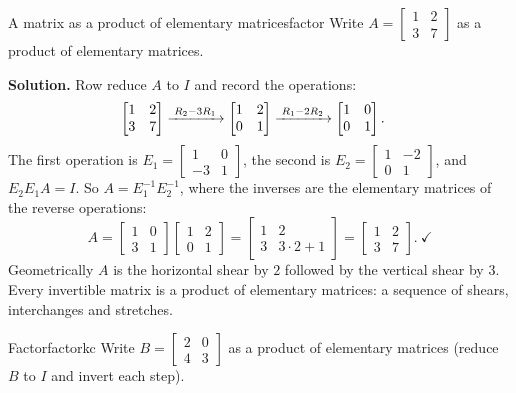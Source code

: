 \documentclass[11pt]{article}
\begin{document}
\begin{exmp}{A matrix as a product of elementary matrices}{factor}
Write $A=\begin{bmatrix}1&2\\3&7\end{bmatrix}$ as a product of elementary matrices.

\textbf{Solution.} Row reduce $A$ to $I$ and record the operations:
\begin{align*}
\begin{bmatrix}1&2\\3&7\end{bmatrix}
&\xrightarrow{\;R_2-3R_1\;}
\begin{bmatrix}1&2\\0&1\end{bmatrix}
\xrightarrow{\;R_1-2R_2\;}
\begin{bmatrix}1&0\\0&1\end{bmatrix}.
\end{align*}
The first operation is $E_1=\begin{bmatrix}1&0\\-3&1\end{bmatrix}$, the second is $E_2=\begin{bmatrix}1&-2\\0&1\end{bmatrix}$, and $E_2E_1A=I$. So $A=E_1^{-1}E_2^{-1}$, where the inverses are the elementary matrices of the reverse operations:
\[
A=\begin{bmatrix}1&0\\3&1\end{bmatrix}\begin{bmatrix}1&2\\0&1\end{bmatrix}=\begin{bmatrix}1&2\\3&3\cdot2+1\end{bmatrix}=\begin{bmatrix}1&2\\3&7\end{bmatrix}.\ \checkmark
\]
Geometrically $A$ is the horizontal shear by $2$ followed by the vertical shear by $3$. Every invertible matrix is a product of elementary matrices: a sequence of shears, interchanges and stretches.
\end{exmp}

\begin{kc}{Factor}{factorkc}
Write $B=\begin{bmatrix}2&0\\4&3\end{bmatrix}$ as a product of elementary matrices (reduce $B$ to $I$ and invert each step).
\end{kc}
\end{document}
